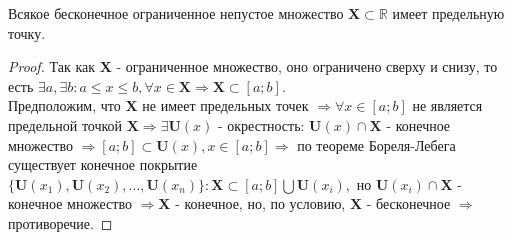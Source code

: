 \begin{theorem}
	Всякое бесконечное ограниченное непустое множество $\mathbf{X} \subset \mathbb{R}$ имеет предельную точку.
\end{theorem}

\begin{proof}
	Так как $\mathbf{X}$ - ограниченное множество, оно ограничено сверху и снизу, то есть $\exists a, \exists b: a \leq x \leq b, \forall x \in \mathbf{X} \Rightarrow \mathbf{X} \subset [a; b]$. \\
	Предположим, что $\mathbf{X}$ не имеет предельных точек $\Rightarrow \forall x \in [a; b]$ не является предельной точкой $\mathbf{X} \Rightarrow \exists \mathbf{U}(x)$ - окрестность: $\mathbf{U}(x) \cap \mathbf{X}$ - конечное множество $\Rightarrow [a; b] \subset \mathbf{U}(x), x \in [a; b] \Rightarrow$ по теореме Бореля-Лебега существует конечное покрытие $\{\mathbf{U}(x_1), \mathbf{U}(x_2), ..., \mathbf{U}(x_n)\}: \mathbf{X} \subset [a; b] \bigcup \mathbf{U}(x_i),$ но $\mathbf{U}(x_i) \cap \mathbf{X}$ - конечное множество $\Rightarrow \mathbf{X}$ - конечное, но, по условию, $\mathbf{X}$ - бесконечное $\Rightarrow$ противоречие.
\end{proof}
